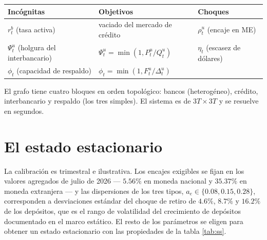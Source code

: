 \begin{center}\small
\begin{tabular}{@{}lll@{}}
\toprule
\textbf{Incógnitas} & \textbf{Objetivos} & \textbf{Choques}\\
\midrule
$r^b_t$ (tasa activa) & vaciado del mercado de crédito & $\rho^u_t$ (encaje en ME)\\
$\Psi^u_t$ (holgura del interbancario) & $\Psi^u_t = \min(1, P^u_t/Q^u_t)$ & $\eta_t$ (escasez de dólares)\\
$\phi_t$ (capacidad de respaldo) & $\phi_t = \min(1, F^u_t/\Delta^u_t)$ &\\
\bottomrule
\end{tabular}
\end{center}

El grafo tiene cuatro bloques en orden topológico: \textsf{bancos} (heterogéneo),
\textsf{crédito}, \textsf{interbancario} y \textsf{respaldo} (los tres simples).
El sistema es de $3T\times 3T$ y se resuelve en segundos.

\section{El estado estacionario}

La calibración es trimestral e ilustrativa. Los encajes exigibles se fijan en los
valores agregados de julio de 2026 --- $5.56\%$ en moneda nacional y $35.37\%$ en
moneda extranjera --- y las dispersiones de los tres tipos, $a_e\in\{0.08,0.15,0.28\}$,
corresponden a desviaciones estándar del choque de retiro de $4.6\%$, $8.7\%$ y
$16.2\%$ de los depósitos, que es el rango de volatilidad del crecimiento de
depósitos documentado en el marco estático. El resto de los parámetros se eligen
para obtener un estado estacionario con las propiedades de la tabla
\ref{tab:ss}.


